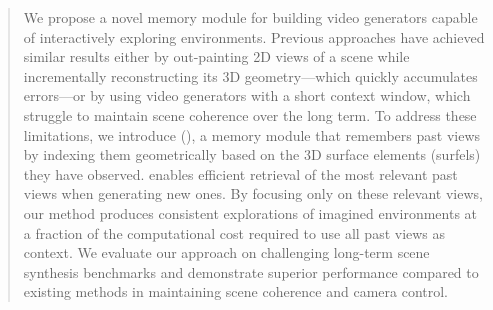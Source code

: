 \begin{abstract}
We propose a novel memory module for building video generators capable of interactively exploring environments.
Previous approaches have achieved similar results either by out-painting 2D views of a scene while incrementally reconstructing its 3D geometry---which quickly accumulates errors---or by using video generators with a short context window, which struggle to maintain scene coherence over the long term.
To address these limitations, we introduce \textit{\mnamel} (\textit{\mname}), a memory module that remembers past views by indexing them geometrically based on the 3D surface elements (surfels) they have observed.
\mname{} enables efficient retrieval of the most relevant past views when generating new ones.
By focusing only on these relevant views, our method produces consistent explorations of imagined environments at a fraction of the computational cost required to use all past views as context.
We evaluate our approach on challenging long-term scene synthesis benchmarks and demonstrate superior performance compared to existing methods in maintaining scene coherence and camera control.
\end{abstract}
